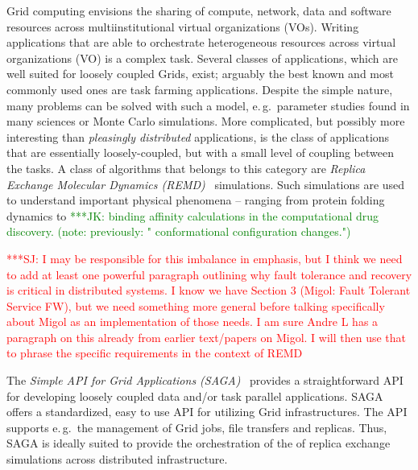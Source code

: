 \documentclass[times, 10pt,twocolumn]{article}
\newcommand{\kimnote}[1]{ {\textcolor{green} { ***JK: #1 }}}
\newcommand{\jhanote}[1]{ {\textcolor{red} { ***SJ: #1 }}}
\begin{document}
                           
Grid computing envisions the sharing of compute, network, data and
software resources across multiinstitutional virtual organizations
(VOs). Writing applications that are able to orchestrate heterogeneous
resources across virtual organizations (VO) is a complex task.  Several 
classes of applications, which are well suited for loosely
coupled Grids, exist; arguably the best known and most commonly used ones are
task farming applications. Despite the simple nature, many problems
can be solved with such a model, e.\,g.\ parameter studies found in
many sciences or Monte Carlo simulations. More
complicated, but possibly more interesting than {\it pleasingly
  distributed} applications, is the class of applications that are
essentially loosely-coupled, but with a small level of coupling
between the tasks.   A class of algorithms that belongs to this category are
\emph{Replica Exchange Molecular Dynamics (REMD)}~\cite{hansmann,Sugita:1999rm} simulations.
Such simulations are used to understand important physical
phenomena -- ranging from protein folding dynamics to \kimnote{binding affinity calculations in the computational drug discovery.  (note: previously: " conformational
configuration changes.")} 

\jhanote{I may be responsible for this imbalance in emphasis, but I
  think we need to add at least one powerful paragraph outlining why
  fault tolerance and recovery is critical in distributed systems. I
  know we have Section 3 (Migol: Fault Tolerant Service FW), but we
  need something more general before talking specifically about Migol
  as an implementation of those needs. I am sure Andre L has a
  paragraph on this already from earlier text/papers on Migol. I will
  then use that to phrase the specific requirements in the context of
  REMD}

The \emph{Simple API for Grid Applications (SAGA)}~\cite{saga_gfd90}
provides a straightforward API for developing loosely coupled data and/or task
parallel applications.
SAGA offers a standardized, easy to use API for utilizing Grid
infrastructures. The API supports e.\,g.\ the management of Grid jobs,
file transfers and replicas. Thus, SAGA is ideally suited to provide
the orchestration of the of replica exchange simulations across
distributed infrastructure.
                                                         
\end{document}
